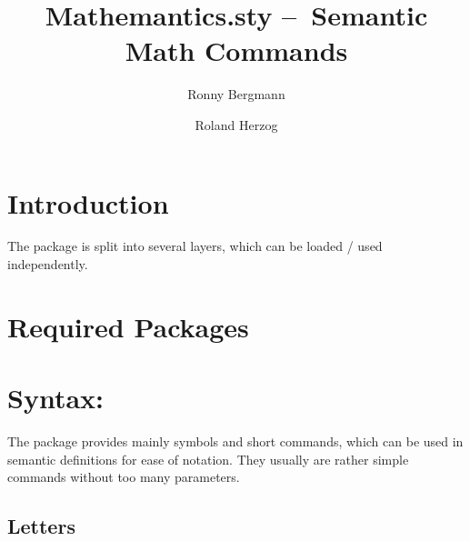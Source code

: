 \documentclass[english,a4paper,DIV=12,parskip=full]{scrartcl}
\date{\ISOToday}
\author{Ronny Bergmann \and Roland Herzog}
\title{Mathemantics.sty – Semantic Math Commands}
\begin{document}
    \maketitle
    \section{Introduction}
    The package is split into several layers, which can be loaded / used independently.

    \section{Required Packages}

    \section{Syntax: \texorpdfstring{}{numapde-syntax.sty}}\label{sec:syntax}

    The  package provides mainly symbols and short commands, which can be used in semantic definitions for ease of notation.
    They usually are rather simple commands without too many parameters.


    \subsection{Letters}\label{subsec:letters}
\end{document}

